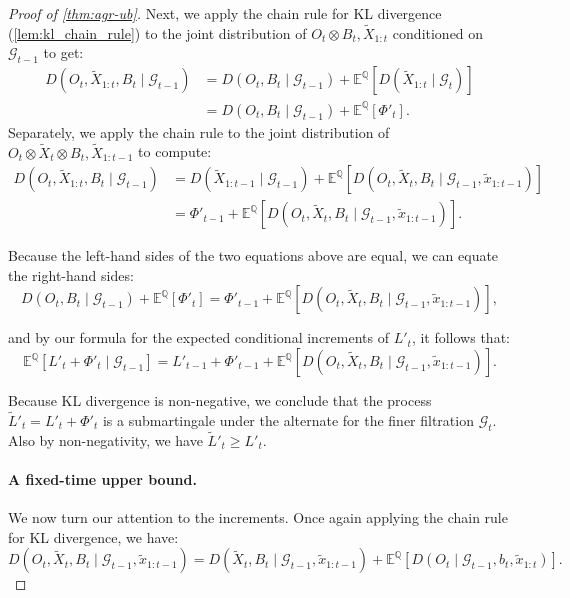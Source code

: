 \documentclass{article}
\newcommand{\E}{\mathbb{E}}
\newcommand{\Alt}{\mathbb{Q}}
\begin{document}
\begin{proof}[Proof of \cref{thm:agr-ub}]
    Next, we apply the chain rule for KL divergence (\cref{lem:kl_chain_rule}) to the joint distribution of $O_t \otimes B_t, \tilde X_{1:t} $ conditioned on $\mathcal{G}_{t-1}$ to get:
    \begin{align*}
        D(O_t, \tilde X_{1:t}, B_t \mid \mathcal{G}_{t-1}) 
        &= D(O_t, B_t \mid \mathcal{G}_{t-1}) + \E^\Alt[D(\tilde X_{1:t}\mid \mathcal{G}_{t})] \\
        &= D(O_t, B_t \mid \mathcal{G}_{t-1}) + \E^\Alt[\Phi'_t].
    \end{align*}
    Separately, we apply the chain rule to the joint distribution of $O_t \otimes \tilde X_t \otimes B_t, \tilde X_{1:t-1}$ to compute:
    \begin{align*}
        D(O_t, \tilde X_{1:t}, B_t \mid \mathcal{G}_{t-1}) 
        &= D(\tilde X_{1:t-1} \mid \mathcal{G}_{t-1}) + \E^\Alt[D(O_t, \tilde X_t, B_t \mid \mathcal{G}_{t-1}, \tilde x_{1:t-1})] \\
        &= \Phi'_{t-1} + \E^\Alt[D(O_t, \tilde X_t, B_t \mid \mathcal{G}_{t-1}, \tilde x_{1:t-1})].
    \end{align*} 

     Because the left-hand sides of the two equations above are equal, we can equate the right-hand sides:
    \begin{equation*}
        D(O_t, B_t \mid \mathcal{G}_{t-1}) + \E^\Alt[\Phi'_t] = \Phi'_{t-1}  + \E^\Alt[D(O_t, \tilde X_t, B_t \mid \mathcal{G}_{t-1},\tilde x_{1:t-1})],
    \end{equation*}

    and by our formula for the expected conditional increments of $L'_t$, it follows that:
    \begin{equation*}
        \E^\Alt[L'_t + \Phi'_t \mid \mathcal{G}_{t-1}] = L'_{t-1} + \Phi'_{t-1} + \E^\Alt[D(O_t, \tilde X_t, B_t \mid \mathcal{G}_{t-1}, \tilde x_{1:t-1})].
    \end{equation*}

    Because KL divergence is non-negative, we conclude that the process $\tilde L'_t = L'_t + \Phi'_t$ is a submartingale under the alternate for the finer filtration $\mathcal{G}_t$. Also by non-negativity, we have $\tilde L'_t \geq L'_t$. 
    
    \paragraph{A fixed-time upper bound.} We now turn our attention to the increments. Once again applying the chain rule for KL divergence, we have:
    \begin{equation*}
        D(O_t, \tilde X_t, B_t \mid \mathcal{G}_{t-1}, \tilde x_{1:t-1}) 
        = D(\tilde X_t, B_t \mid \mathcal{G}_{t-1}, \tilde x_{1:t-1}) + \E^\Alt[D(O_t \mid \mathcal{G}_{t-1}, b_t, \tilde x_{1:t})].
    \end{equation*}


\end{proof}
\end{document}

